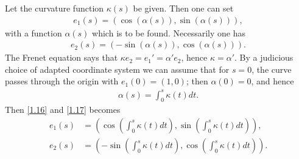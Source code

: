 \documentclass[a4paper]{article}
\numberwithin{equation}{section}
\begin{document}
Let the curvature function $\kappa \left(s\right)$ be given. Then one can set 
\begin{align}
\label{1.16}
{e_1}\left( s \right) = \left( {\cos \left( {\alpha \left( s \right)} \right),\sin \left( {\alpha \left( s \right)} \right)} \right),
\end{align}
with a function $\alpha \left(s\right)$ which is to be found. Necessarily one has
\begin{align}
\label{1.17}
{e_2}\left( s \right) = \left( { - \sin \left( {\alpha \left( s \right)} \right),\cos \left( {\alpha \left( s \right)} \right)} \right).
\end{align}
The Frenet equation says that $\kappa {e_2} = {e_1}' = \alpha '{e_2}$, hence $\kappa =\alpha '$. By a judicious choice of adapted coordinate system we can assume that for $s=0$, the curve passes through the origin with $e_1\left(0\right)=\left(1,0\right)$; then $\alpha \left(0\right) =0$, and hence
\begin{align}
\alpha \left( s \right) = \int_0^s {\kappa \left( t \right)dt} .
\end{align}
Then \eqref{1.16} and \eqref{1.17} becomes
\begin{align}
{e_1}\left( s \right) &= \left( {\cos \left( {\int_0^s {\kappa \left( t \right)dt} } \right),\sin \left( {\int_0^s {\kappa \left( t \right)dt} } \right)} \right),\\
{e_2}\left( s \right) &= \left( { - \sin \left( {\int_0^s {\kappa \left( t \right)dt} } \right),\cos \left( {\int_0^s {\kappa \left( t \right)dt} } \right)} \right).
\end{align}
\end{document}
